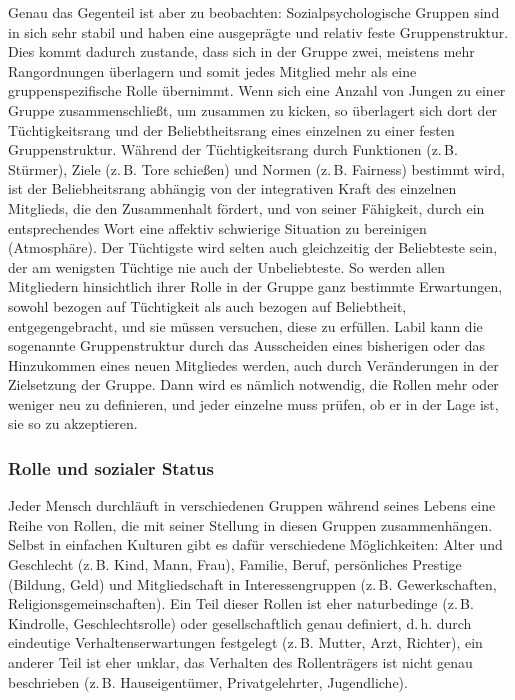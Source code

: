 \documentclass[12pt]{scrartcl}
\DeclareRobustCommand{\zB}{z.\,B.\xspace}
\begin{document}
Genau das Gegenteil ist aber zu beobachten: Sozialpsychologische Gruppen sind
in sich sehr stabil und haben eine ausgeprägte und relativ feste
Gruppenstruktur. Dies kommt dadurch zustande, dass sich in der Gruppe zwei,
meistens mehr Rangordnungen überlagern und somit jedes Mitglied mehr als eine
gruppenspezifische Rolle übernimmt. Wenn sich eine Anzahl von Jungen zu einer
Gruppe zusammenschließt, um zusammen zu kicken, so überlagert sich dort der
Tüchtigkeitsrang und der Beliebtheitsrang eines einzelnen zu einer festen
Gruppenstruktur. Während der Tüchtigkeitsrang durch Funktionen (\zB
Stürmer), Ziele (\zB Tore schießen) und Normen (\zB Fairness) bestimmt
wird, ist der Beliebheitsrang abhängig von der integrativen Kraft des einzelnen
Mitglieds, die den Zusammenhalt fördert, und von seiner Fähigkeit, durch ein
entsprechendes Wort eine affektiv schwierige Situation zu bereinigen
(Atmosphäre). Der Tüchtigste wird selten auch gleichzeitig der Beliebteste
sein, der am wenigsten Tüchtige nie auch der Unbeliebteste. So werden allen
Mitgliedern hinsichtlich ihrer Rolle in der Gruppe ganz bestimmte Erwartungen,
sowohl bezogen auf Tüchtigkeit als auch bezogen auf Beliebtheit,
entgegengebracht, und sie müssen versuchen, diese zu erfüllen. Labil kann die
sogenannte Gruppenstruktur durch das Ausscheiden eines bisherigen oder das
Hinzukommen eines neuen Mitgliedes werden, auch durch Veränderungen in der
Zielsetzung der Gruppe. Dann wird es nämlich notwendig, die Rollen mehr oder
weniger neu zu definieren, und jeder einzelne muss prüfen, ob er in der Lage
ist, sie so zu akzeptieren.

\subsubsection{Rolle und sozialer Status}
Jeder Mensch durchläuft in verschiedenen Gruppen während seines Lebens eine
Reihe von Rollen, die mit seiner Stellung in diesen Gruppen zusammenhängen.
Selbst in einfachen Kulturen gibt es dafür verschiedene Möglichkeiten: Alter
und Geschlecht (\zB Kind, Mann, Frau), Familie, Beruf, persönliches Prestige
(Bildung, Geld) und Mitgliedschaft in Interessengruppen (\zB Gewerkschaften,
Religionsgemeinschaften). Ein Teil dieser Rollen ist eher naturbedinge (\zB
Kindrolle, Geschlechtsrolle) oder gesellschaftlich genau definiert, d.\,h.
durch eindeutige Verhaltenserwartungen festgelegt (\zB Mutter, Arzt, Richter),
ein anderer Teil ist eher unklar, das Verhalten des Rollenträgers ist nicht
genau beschrieben (\zB Hauseigentümer, Privatgelehrter, Jugendliche).
\end{document}
